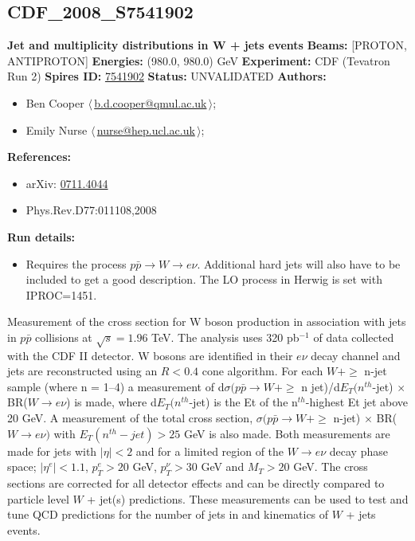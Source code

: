 \subsection[CDF\_2008\_S7541902]{CDF\_2008\_S7541902\,\cite{Aaltonen:2007ip}}
\textbf{Jet \pT and multiplicity distributions in W + jets events}\newline
\textbf{Beams:} [PROTON, ANTIPROTON] \newline
\textbf{Energies:} (980.0, 980.0) GeV \newline
\textbf{Experiment:} CDF (Tevatron Run 2) \newline
\textbf{Spires ID:} \href{http://www.slac.stanford.edu/spires/find/hep/www?rawcmd=key+7541902}{7541902}\newline
\textbf{Status:} UNVALIDATED\newline
\textbf{Authors:}
\begin{itemize}
  \item Ben Cooper $\langle\,$\href{mailto:b.d.cooper@qmul.ac.uk}{b.d.cooper@qmul.ac.uk}$\,\rangle$;
  \item Emily Nurse $\langle\,$\href{mailto:nurse@hep.ucl.ac.uk}{nurse@hep.ucl.ac.uk}$\,\rangle$;
\end{itemize}
\textbf{References:}
\begin{itemize}
  \item arXiv: \href{http://arxiv.org/abs/0711.4044}{0711.4044}
  \item Phys.Rev.D77:011108,2008
\end{itemize}
\textbf{Run details:}
\begin{itemize}

  \item Requires the process $p\bar{p} \rightarrow {W} \rightarrow {e}\nu$. Additional hard jets will also have to be included to get a good description. The LO process in Herwig is set with IPROC=1451.\end{itemize}

\noindent Measurement of the cross section for W boson production in association with jets in $p\bar{p}$ collisions at $\sqrt{s}=1.96$ TeV. The analysis uses 320 pb$^{-1}$ of data collected with the CDF II detector. W bosons are identified in their $e\nu$ decay channel and jets are reconstructed using an $R < 0.4$ cone algorithm. For each $W + \geq$ n-jet sample (where n = 1--4) a measurement of d$\sigma({p}\bar{p} \rightarrow W + \geq$ n jet)/d$E_T(n^{th}$-jet) $\times$ BR($W \rightarrow{e}\nu$) is made, where d$E_T(n^{th}$-jet) is the Et of the n$^{th}$-highest Et jet above 20 GeV. A measurement of the total cross section, $\sigma(p\bar{p} \rightarrow W + \geq$ n-jet) $\times$ BR($W \rightarrow{e}\nu)$ with $E_T(n^{th}-jet) > 25$ GeV is also made. Both measurements are made for jets with $|\eta| < 2$ and for a limited region of the $W \rightarrow{e}\nu$ decay phase space; $|\eta^{e}| < 1.1$, $p_{T}^{e} > 20$ GeV, $p_{T}^{\nu} > 30$ GeV and $M_{T} > 20$ GeV. The cross sections are corrected for all detector effects and can be directly compared to particle level $W$ + jet(s) predictions. These measurements can be used to test and tune QCD predictions for the number of jets in and kinematics of $W$ + jets events.

